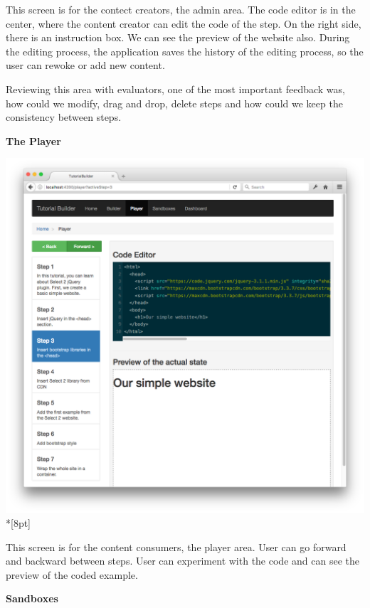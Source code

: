 \documentclass[12pt, a4paper, oneside, openright, medskipamount]{report}
\begin{document}
This screen is for the contect creators, the admin area. The code editor is in the center, where the content creator can edit the code of the step. On the right side, there is an instruction box. We can see the preview of the website also. During the editing process, the application saves the history of the editing process, so the user can rewoke or add new content.

Reviewing this area with evaluators, one of the most important feedback was, how could we modify, drag and drop, delete steps and how could we keep the consistency between steps.

\newpage

\textbf{The Player}

\includegraphics[width=1\textwidth]{assets/tour-screenshots/the-player.png}\\*[8pt]

This screen is for the content consumers, the player area. User can go forward and backward between steps. User can experiment with the code and can see the preview of the coded example.

\newpage

\textbf{Sandboxes}
\end{document}
